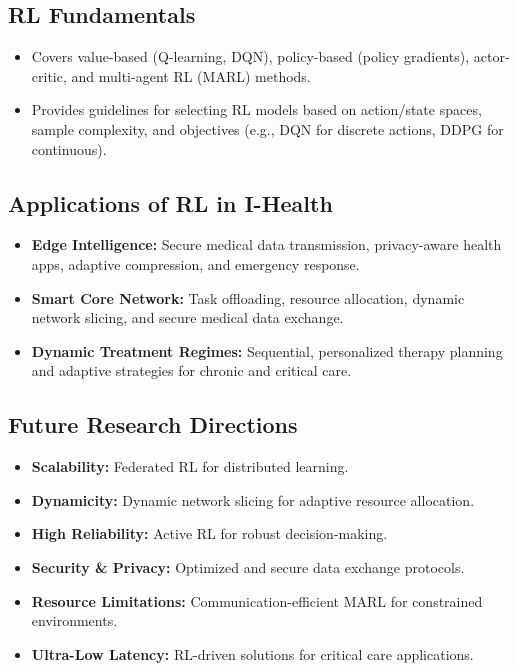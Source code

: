 \subsection*{RL Fundamentals}
\begin{itemize}
    \item Covers value-based (Q-learning, DQN), policy-based (policy gradients), actor-critic, and multi-agent RL (MARL) methods.
    \item Provides guidelines for selecting RL models based on action/state spaces, sample complexity, and objectives (e.g., DQN for discrete actions, DDPG for continuous).
\end{itemize}

\subsection*{Applications of RL in I-Health}
\begin{itemize}
    \item \textbf{Edge Intelligence:} Secure medical data transmission, privacy-aware health apps, adaptive compression, and emergency response.
    \item \textbf{Smart Core Network:} Task offloading, resource allocation, dynamic network slicing, and secure medical data exchange.
    \item \textbf{Dynamic Treatment Regimes:} Sequential, personalized therapy planning and adaptive strategies for chronic and critical care.
\end{itemize}

\subsection*{Future Research Directions}
\begin{itemize}
    \item \textbf{Scalability:} Federated RL for distributed learning.
    \item \textbf{Dynamicity:} Dynamic network slicing for adaptive resource allocation.
    \item \textbf{High Reliability:} Active RL for robust decision-making.
    \item \textbf{Security \& Privacy:} Optimized and secure data exchange protocols.
    \item \textbf{Resource Limitations:} Communication-efficient MARL for constrained environments.
    \item \textbf{Ultra-Low Latency:} RL-driven solutions for critical care applications.
\end{itemize}

